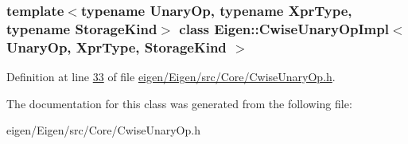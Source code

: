 \subsubsection*{template$<$typename Unary\+Op, typename Xpr\+Type, typename Storage\+Kind$>$\newline
class Eigen\+::\+Cwise\+Unary\+Op\+Impl$<$ Unary\+Op, Xpr\+Type, Storage\+Kind $>$}



Definition at line \hyperlink{eigen_2_eigen_2src_2_core_2_cwise_unary_op_8h_source_l00033}{33} of file \hyperlink{eigen_2_eigen_2src_2_core_2_cwise_unary_op_8h_source}{eigen/\+Eigen/src/\+Core/\+Cwise\+Unary\+Op.\+h}.



The documentation for this class was generated from the following file\+:\begin{DoxyCompactItemize}
\item 
eigen/\+Eigen/src/\+Core/\+Cwise\+Unary\+Op.\+h\end{DoxyCompactItemize}
